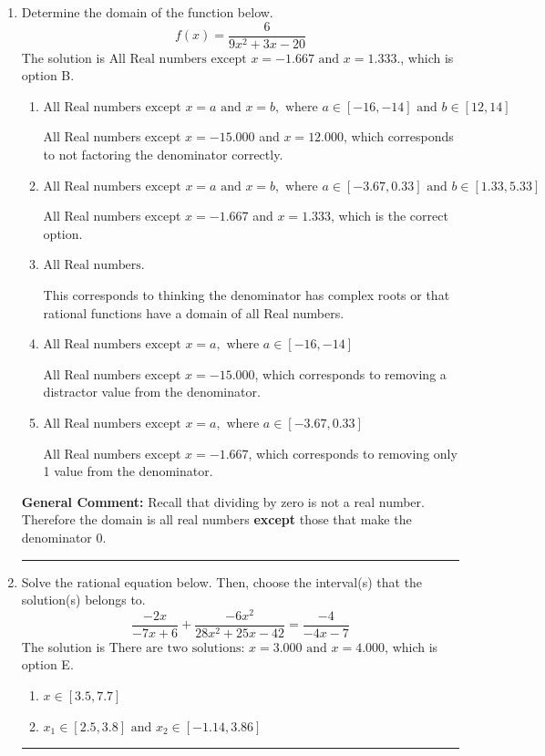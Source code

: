 \documentclass{extbook}[14pt]
\newcommand{\litem}[1]{\item #1

\rule{\textwidth}{0.4pt}}
\begin{document}
\begin{enumerate}\litem{
Determine the domain of the function below.
\[ f(x) = \frac{6}{9x^{2} +3 x -20} \]The solution is \( \text{All Real numbers except } x = -1.667 \text{ and } x = 1.333. \), which is option B.\begin{enumerate}[label=\Alph*.]
\item \( \text{All Real numbers except } x = a \text{ and } x = b, \text{ where } a \in [-16, -14] \text{ and } b \in [12, 14] \)

All Real numbers except $x = -15.000$ and $x = 12.000$, which corresponds to not factoring the denominator correctly.
\item \( \text{All Real numbers except } x = a \text{ and } x = b, \text{ where } a \in [-3.67, 0.33] \text{ and } b \in [1.33, 5.33] \)

All Real numbers except $x = -1.667$ and $x = 1.333$, which is the correct option.
\item \( \text{All Real numbers.} \)

This corresponds to thinking the denominator has complex roots or that rational functions have a domain of all Real numbers.
\item \( \text{All Real numbers except } x = a, \text{ where } a \in [-16, -14] \)

All Real numbers except $x = -15.000$, which corresponds to removing a distractor value from the denominator.
\item \( \text{All Real numbers except } x = a, \text{ where } a \in [-3.67, 0.33] \)

All Real numbers except $x = -1.667$, which corresponds to removing only 1 value from the denominator.
\end{enumerate}

\textbf{General Comment:} Recall that dividing by zero is not a real number. Therefore the domain is all real numbers \textbf{except} those that make the denominator 0.
}
\litem{
Solve the rational equation below. Then, choose the interval(s) that the solution(s) belongs to.
\[ \frac{-2x}{-7x + 6} + \frac{-6x^{2}}{28x^{2} +25 x -42} = \frac{-4}{-4x -7} \]The solution is \( \text{There are two solutions: } x = 3.000 \text{ and } x = 4.000 \), which is option E.\begin{enumerate}[label=\Alph*.]
\item \( x \in [3.5,7.7] \)


\item \( x_1 \in [2.5, 3.8] \text{ and } x_2 \in [-1.14,3.86] \)



\end{enumerate}}
\end{enumerate}
\end{document}

